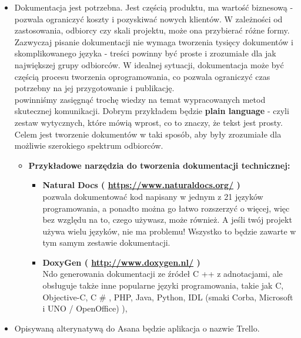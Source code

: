 \documentclass[12pt]{article}
\renewcommand{\_}{\kern-1.5pt\textunderscore\kern-1.5pt}
\begin{document}
\begin{itemize}
\begin{itemize}
\begin{itemize}
\end{itemize}
	\item Dokumentacja jest potrzebna. Jest częścią produktu, ma wartość biznesową\textbf{ }- pozwala ograniczyć koszty i pozyskiwać nowych klientów.  W zależności od zastosowania, odbiorcy czy skali projektu, może ona przybierać różne formy. Zazwyczaj pisanie dokumentacji nie wymaga tworzenia tysięcy dokumentów i skomplikowanego języka - treści powinny być proste i zrozumiałe dla jak największej grupy odbiorców. W idealnej sytuacji, dokumentacja może być częścią procesu tworzenia oprogramowania, co pozwala ograniczyć czas potrzebny na jej przygotowanie i publikację.\\
powinniśmy zasięgnąć trochę wiedzy na temat wypracowanych metod skutecznej komunikacji. Dobrym przykładem będzie \textbf{plain language} - czyli zestaw wytycznych, które mówią wprost, co to znaczy, że tekst jest prosty. Celem jest tworzenie dokumentów w taki sposób, aby były zrozumiałe dla możliwie szerokiego spektrum odbiorców.\par

\begin{itemize}
	\item \textbf{Przykładowe narzędzia do tworzenia dokumentacji technicznej:}\par

\begin{itemize}
	\item \textbf{Natural Docs ( \href{https://www.naturaldocs.org/}{https://www.naturaldocs.org/} )\\
}pozwala dokumentować kod napisany w jednym z 21 języków programowania, a ponadto można go łatwo rozszerzyć o więcej, więc bez względu na to, czego używasz, może również. A jeśli twój projekt używa wielu języków, nie ma problemu! Wszystko to będzie zawarte w tym samym zestawie dokumentacji.\par

	\item \textbf{DoxyGen ( \href{http://www.doxygen.nl/}{http://www.doxygen.nl/} )\\
}Ndo generowania dokumentacji ze źródeł C ++ z adnotacjami, ale obsługuje także inne popularne języki programowania, takie jak C, Objective-C, C $\#$ , PHP, Java, Python, IDL (smaki Corba, Microsoft i UNO / OpenOffice) ),\par


\vspace{\baselineskip}

\end{itemize}
\end{itemize}
	\item Opisywaną alterynatywą do Asana będzie aplikacja o nazwie Trello.
\end{itemize}
\end{itemize}\par
\end{document}
